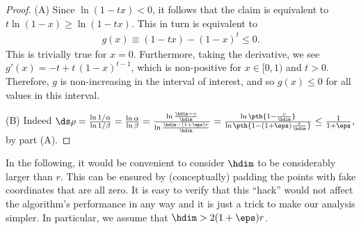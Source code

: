 \begin{proof}
    (A) Since $\ln (1-tx) < 0$, it follows that the claim is
    equivalent to $t\ln(1-x)\geq\ln(1-tx)$.  This in turn is
    equivalent to
    \begin{align*}
        g(x)\equiv(1-tx)-(1-x)^t\leq0.
    \end{align*}
    This is trivially true for $x=0$.  Furthermore, taking the
    derivative, we see $g'(x) = -t + t\,(1-x)^{t-1}$, which is
    non-positive for $x\in[0,1)$ and $t > 0$.  Therefore, $g$ is
    non-increasing in the interval of interest, and so $g(x) \leq 0$
    for all values in this interval.

    (B)
    Indeed
    \begin{math}
        \ds \rho%
        =%
        \frac{\ln{1/\alpha}}{\ln{1/\beta}}%
        =%
        \frac{\ln{\alpha}}{\ln{\beta}}%
        =%
        \frac{\ln \frac{\hdim-r}{\hdim}}{\ln
           \frac{\hdim-(1+\eps)r}{\hdim}}%
        =%
        \frac{\ln \pth{ 1 - \frac{r}{\hdim}}}{\ln \pth{1 -
              (1+\eps)\frac{r}{\hdim}}}%
        \leq%
        \frac{1}{1+\eps},
    \end{math}
    by part (A).
\end{proof}


In the following, it would be convenient to consider $\hdim$ to be
considerably larger than $r$. This can be ensured by (conceptually)
padding the points with fake coordinates that are all zero.  It is
easy to verify that this ``hack'' would not affect the algorithm's
performance in any way and it is just a trick to make our analysis
simpler.  In particular, we assume that $\hdim > 2 (1+\eps)r$.

